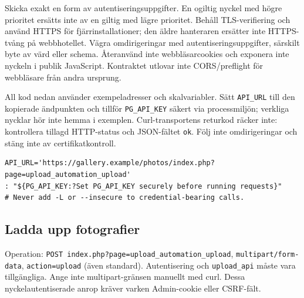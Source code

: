 \documentclass[11pt,a4paper]{article}
\newcommand{\codeword}[1]{\nolinkurl{#1}}
\begin{document}
Skicka exakt en form av autentiseringsuppgifter. En ogiltig nyckel med högre prioritet
ersätts inte av en giltig med lägre prioritet. Behåll TLS-verifiering och använd HTTPS för
fjärrinstallationer; den äldre hanteraren ersätter inte HTTPS-tvång på webbhotellet. Vägra
omdirigeringar med autentiseringsuppgifter, särskilt byte av värd eller schema. Återanvänd
inte webbläsarcookies och exponera inte nyckeln i publik JavaScript. Kontraktet utlovar inte
CORS/preflight för webbläsare från andra ursprung.

All kod nedan använder exempeladresser och skalvariabler. Sätt \codeword{API_URL} till den
kopierade ändpunkten och tillför \codeword{PG_API_KEY} säkert via processmiljön; verkliga
nycklar hör inte hemma i exemplen. Curl-transportens returkod räcker inte: kontrollera
tillagd HTTP-status och JSON-fältet \codeword{ok}. Följ inte omdirigeringar och stäng inte
av certifikatkontroll.

\begin{lstlisting}[language={}]
API_URL='https://gallery.example/photos/index.php?page=upload_automation_upload'
: "${PG_API_KEY:?Set PG_API_KEY securely before running requests}"
# Never add -L or --insecure to credential-bearing calls.
\end{lstlisting}

\subsection{\texorpdfstring{Ladda upp fotografier}{Ladda upp fotografier}}

\label{api352:upload}

Operation: \codeword{POST index.php?page=upload_automation_upload},
\codeword{multipart/form-data}, \codeword{action=upload} (även standard). Autentisering och
\codeword{upload_api} måste vara tillgängliga. Ange inte multipart-gränsen manuellt med
curl. Dessa nyckelautentiserade anrop kräver varken Admin-cookie eller CSRF-fält.
\end{document}
